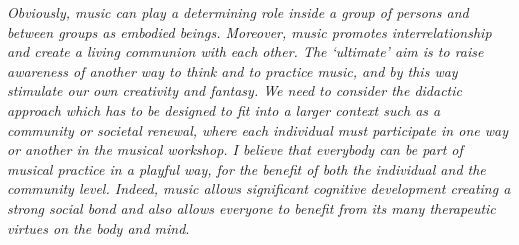 \documentclass{article}
\begin{document}
\textsl{Obviously, music can play a determining role inside a group of persons and between groups as embodied beings.
Moreover, music promotes interrelationship and create a living communion with each other.
The `ultimate' aim is to raise awareness of another way to think and to practice music, and by this way stimulate our own creativity and fantasy.
We need to consider the didactic approach which has to be designed to fit into a larger context such as a community or societal renewal, where each individual must participate in one way or another in the musical workshop. 
I believe that everybody can be part of musical practice in a playful way, for the benefit of  both the individual and the community level.
%  
Indeed, music allows significant cognitive development creating a strong social bond and also allows everyone to benefit from its many
therapeutic virtues on the body and mind}.

 


\end{document}
